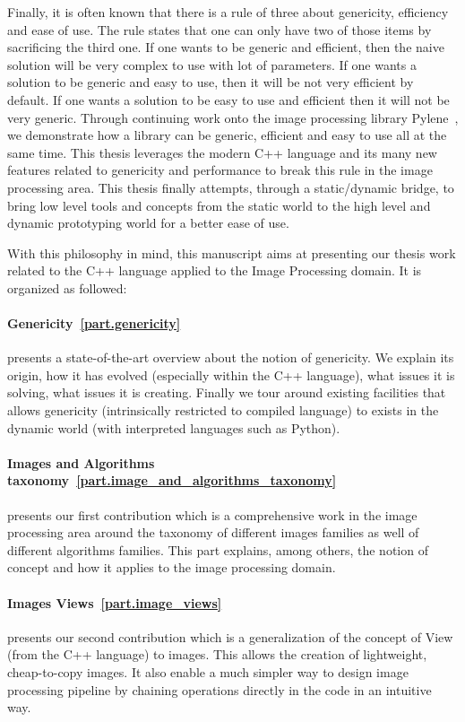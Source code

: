 Finally,  it is often known that there is a rule of three about genericity, efficiency and ease
of use. The rule states that one can only have two of those items by sacrificing the third one. If one wants to be
generic and efficient, then the naive solution will be very complex to use with lot of parameters. If one wants a
solution to be generic and easy to use, then it will be not very efficient by default. If one wants a solution to be
easy to use and efficient then it will not be very generic. Through continuing work onto the image processing library
Pylene~\cite{carlinet.2018.pylena}, we demonstrate how a library can be generic, efficient and easy to use all at the
same time. This thesis leverages the modern C++ language and its many new features related to genericity and performance
to break this rule in the image processing area. This thesis finally attempts, through a static/dynamic bridge, to bring
low level tools and concepts from the static world to the high level and dynamic prototyping world for a better ease of
use.

With this philosophy in mind, this manuscript aims at presenting our thesis work related to the C++ language applied to
the Image Processing domain. It is organized as followed:

\paragraph{Genericity~\ref{part.genericity}} presents a state-of-the-art overview about the notion of genericity. We
explain its origin, how it has evolved (especially within the C++ language), what issues it is solving, what issues it
is creating. Finally we tour around existing facilities that allows genericity (intrinsically restricted to compiled
language) to exists in the dynamic world (with interpreted languages such as Python).

\paragraph{Images and Algorithms taxonomy~\ref{part.image_and_algorithms_taxonomy}} presents our first contribution
which is a comprehensive work in the image processing area around the taxonomy of different images families as well of
different algorithms families. This part explains, among others, the notion of concept and how it applies to the
image processing domain.

\paragraph{Images Views~\ref{part.image_views}} presents our second contribution which is a generalization of the
concept of View (from the C++ language) to images. This allows the creation of lightweight, cheap-to-copy images. It
also enable a much simpler way to design image processing pipeline by chaining operations directly in the code in an
intuitive way.


